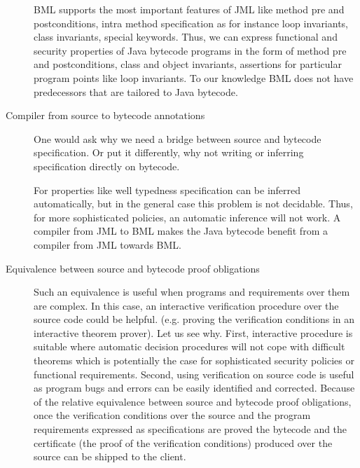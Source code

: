\begin{description}
 

	 BML supports the most important features of JML like method pre and postconditions, intra method specification as for instance loop invariants, class invariants, special
	 keywords. Thus, we can express functional and security properties of Java
	 bytecode programs in the form of method pre and postconditions, class and object invariants, assertions
	 for particular program points like loop invariants. To our knowledge BML does not have predecessors that are tailored 
	 to Java bytecode.  

   \item [Compiler from source to bytecode annotations]
         One would ask why we need a bridge between source and bytecode specification. Or put it differently, why not
	 writing or inferring specification directly on bytecode.
 
	 For properties like well typedness specification can be inferred automatically,
	 but in the general case this problem is not decidable.  
	 Thus, for more sophisticated policies, an automatic inference will not work.
	 A compiler from JML to BML  makes the Java  bytecode benefit from
	 a compiler from JML  towards BML.

    \item[Equivalence between source and bytecode proof obligations] Such an equivalence is useful when programs and requirements over them are complex.
         In this case, an interactive verification procedure over the source code  could be helpful.
	 (e.g. proving the verification conditions in an interactive theorem prover).
	 Let us see why.
	 First, interactive  procedure is suitable where automatic decision procedures will not cope with
	 difficult theorems which is potentially the case for sophisticated security policies or functional requirements. 
	 Second, using verification on source code is useful as program bugs and errors can be easily identified and corrected.
	 Because of the relative equivalence between source and bytecode proof obligations, 
	 once the verification conditions over the source and the program requirements expressed as specifications are
	 proved the bytecode and the certificate (the proof of the verification conditions) produced over the source
	 can be shipped  to the client.
\end{description}





